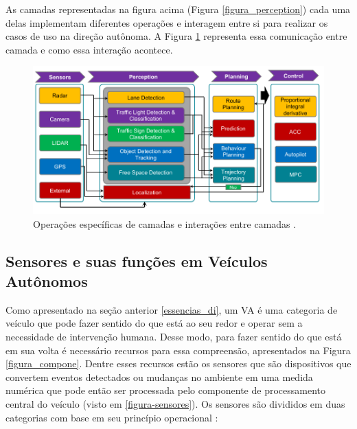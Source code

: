 As camadas representadas na figura acima (Figura \ref{figura_perception}) cada uma delas implementam diferentes operações e interagem entre si para realizar os casos de uso na direção autônoma. A Figura \ref{figura_camadas} representa essa comunicação entre camada e como essa interação acontece.

\begin{figure}[H]
\centering
\includegraphics[width=\textwidth]{Figures/layer-sens.png}
\caption{Operações específicas de camadas e interações entre camadas \cite{sensors-yet}.}
\label{figura_camadas}
\end{figure}



\subsection{Sensores e suas funções em Veículos Autônomos} \label{sensores-a}

Como apresentado na seção anterior \ref{essencias_di}, um VA é uma categoria de veículo que pode fazer sentido do que está ao seu redor e operar sem a necessidade de intervenção humana. Desse modo, para fazer sentido do que está em sua volta é necessário recursos para essa compreensão, apresentados na Figura \ref{figura_compone}. Dentre esses recursos estão os sensores que são dispositivos que convertem eventos detectados ou mudanças no ambiente em uma medida numérica que pode então ser processada pelo componente de processamento central do veículo (visto em \ref{figura-sensores}). 
Os sensores são divididos em duas categorias com base em seu princípio operacional \cite{sensors}: 

